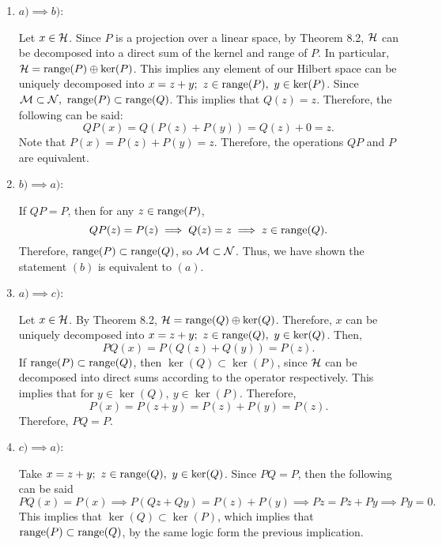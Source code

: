 \begin{solution}

    \begin{enumerate}
        \item[] \underline{$a) \implies b)$}:

        \hop
        Let $x \in \mathcal{H}$. Since $P$ is a projection over a linear space, by Theorem 8.2, $\mathcal{H}$ can be decomposed into a direct sum of the kernel and range of $P$. In particular, $\mathcal{H} = \text{range} (P) \oplus \ker (P)$. This implies any element of our Hilbert space can be uniquely decomposed into $x = z + y; \  z \in \text{range}(P), \ y \in \ker (P)$. Since $\mathcal{M} \subset \mathcal{N}, \ \text{range}(P) \subset \text{range}(Q)$. This implies that $Q(z) = z$. Therefore, the following can be said:
        \[QP(x) = Q(P(z) + P(y)) = Q(z) + 0 = z.\]
        Note that $P(x) = P(z) + P(y) = z$. Therefore, the operations $QP$ and $P$ are equivalent. 

        \item[] \underline{$b) \implies a)$}:

        \hop
        If $QP = P$, then for any $z \in \text{range}(P)$, 
        \[QP(z) = P(z) \implies Q(z) = z \implies z \in \text{range}(Q).\]
        Therefore, $\text{range}(P) \subset \text{range}(Q)$, so $\mathcal{M} \subset \mathcal{N}$. Thus, we have shown the statement $(b)$ is equivalent to $(a)$.

        \newpage
        \item [] \underline{$a) \implies c)$}:

        \hop
        Let $x \in \mathcal{H}$. By Theorem 8.2, $\mathcal{H} = \text{range} (Q) \oplus \ker (Q)$. Therefore, $x$ can be uniquely decomposed into $x = z + y; \ z \in \range (Q), \ y \in \ker(Q)$. Then, 
        \[PQ(x) = P(Q(z) + Q(y)) = P(z).\]
        If $\text{range}(P) \subset \text{range}(Q)$, then $\ker(Q) \subset \ker(P)$, since $\mathcal{H}$ can be decomposed into direct sums according to the operator respectively. This implies that for $y \in \ker(Q), \ y \in \ker (P)$. Therefore, 
        \[P(x) = P(z + y) = P(z) + P(y) = P(z).\]
        Therefore, $PQ = P$.

        \item[] \underline{$c) \implies a)$}:

        \hop
        Take $x = z + y; \ z \in \range(Q), \ y \in \ker(Q)$. Since $PQ = P$, then the following can be said
        \[PQ(x) = P(x) \implies P(Qz + Qy) = P(z) + P(y) \implies Pz = Pz + Py \implies Py = 0.\]
        This implies that $\ker (Q) \subset \ker(P)$, which implies that $\text{range}(P) \subset \text{range}(Q)$, by the same logic form the previous implication. 
    

\end{enumerate}
\end{solution}
